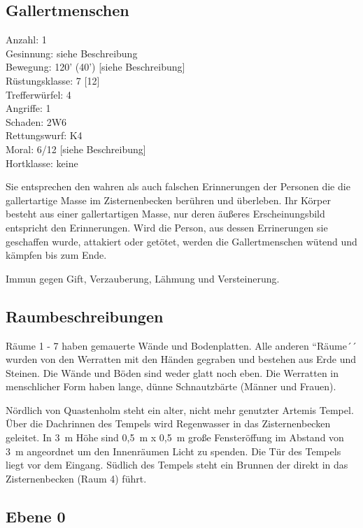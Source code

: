 \subsection{Gallertmenschen}

\begin{tabbing}
Anzahl: 1\\
Gesinnung: siehe Beschreibung\\
Bewegung: 120' (40') [siehe Beschreibung]\\
Rüstungsklasse: 7 [12]\\
Trefferwürfel: 4\\
Angriffe: 1\\
Schaden: 2W6\\
Rettungswurf: K4\\
Moral: 6/12 [siehe Beschreibung]\\
Hortklasse: keine\\
\end{tabbing}

Sie entsprechen den wahren als auch falschen Erinnerungen der Personen die
die gallertartige Masse im Zisternenbecken berühren und überleben. Ihr
Körper besteht aus einer gallertartigen Masse, nur deren äußeres
Erscheinungsbild entspricht den Erinnerungen. Wird die Person, aus
dessen Errinerungen sie geschaffen wurde, attakiert oder getötet,
werden die Gallertmenschen wütend und kämpfen bis zum Ende.

Immun gegen Gift, Verzauberung, Lähmung und Versteinerung.

\subsection{Raumbeschreibungen}

Räume 1 - 7 haben gemauerte Wände und Bodenplatten. Alle anderen
``Räume´´ wurden von den Werratten mit den Händen gegraben und bestehen
aus Erde und Steinen. Die Wände und Böden sind weder glatt noch eben.
Die Werratten in menschlicher Form haben lange, dünne Schnautzbärte
(Männer und Frauen).

Nördlich von Quastenholm steht ein alter, nicht mehr genutzter
Artemis Tempel. Über die Dachrinnen des Tempels wird Regenwasser
in das Zisternenbecken geleitet. In 3~m Höhe sind 0,5~m x 0,5~m große
Fensteröffung im Abstand von 3~m angeordnet um den Innenräumen Licht zu
spenden. Die Tür des Tempels liegt vor dem Eingang. Südlich des Tempels
steht ein Brunnen der direkt in das Zisternenbecken (Raum 4) führt.

\subsection{Ebene 0}

